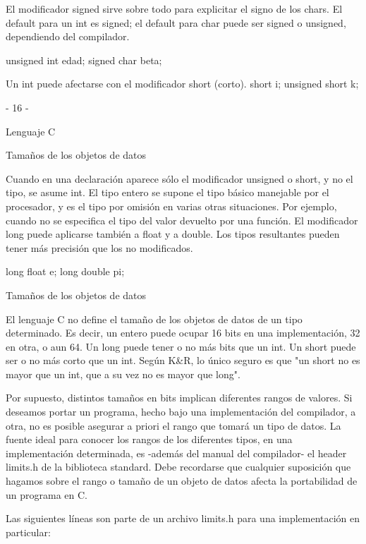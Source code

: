 El modificador signed sirve sobre todo para explicitar el signo de los chars. El default para un int es
signed; el default para char puede ser signed o unsigned, dependiendo del compilador.

unsigned int edad;
signed char beta;

Un int puede afectarse con el modificador short (corto).
short i;
unsigned short k;

- 16 -

Lenguaje C

Tamaños de los objetos de datos

Cuando en una declaración aparece sólo el modificador unsigned o short, y no el tipo, se asume int. El
tipo entero se supone el tipo básico manejable por el procesador, y es el tipo por omisión en varias
otras situaciones. Por ejemplo, cuando no se especifica el tipo del valor devuelto por una función.
El modificador long puede aplicarse también a float y a double. Los tipos resultantes pueden tener más
precisión que los no modificados.

long float e; long double pi;

Tamaños de los objetos de datos

El lenguaje C no define el tamaño de los objetos de datos de un tipo determinado. Es decir, un entero
puede ocupar 16 bits en una implementación, 32 en otra, o aun 64. Un long puede tener o no más bits
que un int. Un short puede ser o no más corto que un int. Según K&R, lo único seguro es que "un
short no es mayor que un int, que a su vez no es mayor que long".

Por supuesto, distintos tamaños en bits implican diferentes rangos de valores. Si deseamos portar un
programa, hecho bajo una implementación del compilador, a otra, no es posible asegurar a priori el
rango que tomará un tipo de datos. La fuente ideal para conocer los rangos de los diferentes tipos, en
una implementación determinada, es -además del manual del compilador- el header limits.h de la
biblioteca standard. Debe recordarse que cualquier suposición que hagamos sobre el rango o tamaño
de un objeto de datos afecta la portabilidad de un programa en C.

Las siguientes líneas son parte de un archivo limits.h para una implementación en particular:

